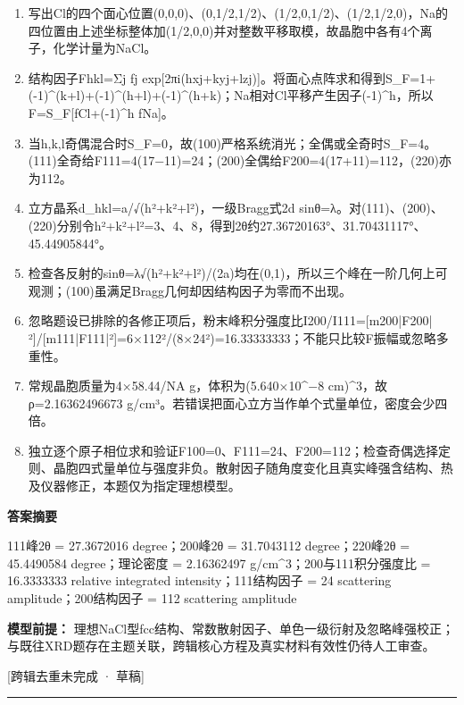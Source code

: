 \documentclass[UTF8,11pt,a4paper]{ctexart}
\begin{document}
\begin{enumerate}
\item 写出Cl的四个面心位置(0,0,0)、(0,1/2,1/2)、(1/2,0,1/2)、(1/2,1/2,0)，Na的四位置由上述坐标整体加(1/2,0,0)并对整数平移取模，故晶胞中各有4个离子，化学计量为NaCl。
\item 结构因子Fhkl=Σj fj exp[2πi(hxj+kyj+lzj)]。将面心点阵求和得到S\_F=1+(-1)\textasciicircum{}(k+l)+(-1)\textasciicircum{}(h+l)+(-1)\textasciicircum{}(h+k)；Na相对Cl平移产生因子(-1)\textasciicircum{}h，所以F=S\_F[fCl+(-1)\textasciicircum{}h fNa]。
\item 当h,k,l奇偶混合时S\_F=0，故(100)严格系统消光；全偶或全奇时S\_F=4。(111)全奇给F111=4(17−11)=24；(200)全偶给F200=4(17+11)=112，(220)亦为112。
\item 立方晶系d\_hkl=a/√(h²+k²+l²)，一级Bragg式2d sinθ=λ。对(111)、(200)、(220)分别令h²+k²+l²=3、4、8，得到2θ约27.36720163°、31.70431117°、45.44905844°。
\item 检查各反射的sinθ=λ√(h²+k²+l²)/(2a)均在(0,1)，所以三个峰在一阶几何上可观测；(100)虽满足Bragg几何却因结构因子为零而不出现。
\item 忽略题设已排除的各修正项后，粉末峰积分强度比I200/I111=[m200|F200|²]/[m111|F111|²]=6×112²/(8×24²)=16.33333333；不能只比较F振幅或忽略多重性。
\item 常规晶胞质量为4×58.44/NA g，体积为(5.640×10\textasciicircum{}−8 cm)\textasciicircum{}3，故ρ=2.16362496673 g/cm³。若错误把面心立方当作单个式量单位，密度会少四倍。
\item 独立逐个原子相位求和验证F100=0、F111=24、F200=112；检查奇偶选择定则、晶胞四式量单位与强度非负。散射因子随角度变化且真实峰强含结构、热及仪器修正，本题仅为指定理想模型。
\end{enumerate}
\noindent\textbf{答案摘要}\par
111峰2θ = 27.3672016 degree；200峰2θ = 31.7043112 degree；220峰2θ = 45.4490584 degree；理论密度 = 2.16362497 g/cm\textasciicircum{}3；200与111积分强度比 = 16.3333333 relative integrated intensity；111结构因子 = 24 scattering amplitude；200结构因子 = 112 scattering amplitude\par
\noindent\textbf{模型前提：}
理想NaCl型fcc结构、常数散射因子、单色一级衍射及忽略峰强校正；与既往XRD题存在主题关联，跨辑核心方程及真实材料有效性仍待人工审查。\par
\noindent\textcolor{red!65!black}{[跨辑去重未完成 · 草稿]} \par
\medskip\hrule\medskip
{}
\end{document}
